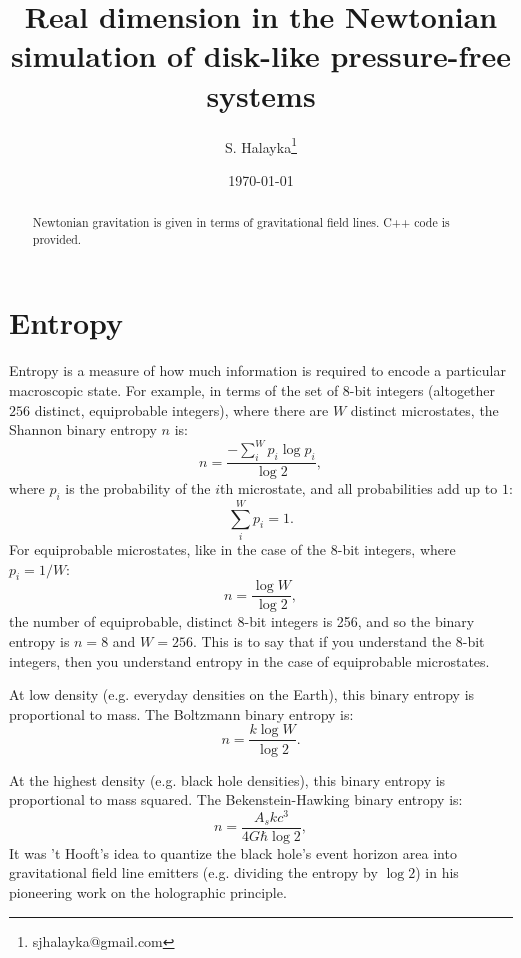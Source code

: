 \documentclass[12pt]{article}
\title{Real dimension in the Newtonian simulation of disk-like pressure-free systems}
\author{S. Halayka\footnote{sjhalayka@gmail.com}}
\date{\today\;\currenttime}
\begin{document}
 
\maketitle

\begin{abstract}
Newtonian gravitation is given in terms of gravitational field lines.
C++ code is provided.
\end{abstract}




\section{Entropy}
Entropy is a measure of how much information is required to encode a particular macroscopic state.
For example, in terms of the set of 8-bit integers (altogether $256$ distinct, equiprobable integers), where there are $W$ distinct microstates, the Shannon binary entropy $n$ is:
\begin{equation}
n =  \frac{-\sum_{i}^{W} p_i \log p_i} {\log 2},
\end{equation}
where $p_i$ is the probability of the $i$th microstate, and all probabilities add up to $1$:
\begin{equation}
\sum_{i}^{W} p_i = 1.
\end{equation}
For equiprobable microstates, like in the case of the 8-bit integers, where $p_i = 1/W$:
\begin{equation}
n = \frac{\log W}{\log 2},
\end{equation}
the number of equiprobable, distinct 8-bit integers is 256, and so the binary entropy is $n = 8$ and $W= 256$.
This is to say that if you understand the 8-bit integers, then you understand entropy in the case of equiprobable microstates.

At low density (e.g. everyday densities on the Earth), this binary entropy is proportional to mass.
The Boltzmann binary entropy is:
\begin{equation}
n = \frac{k \log W}{\log 2}.
\end{equation}

At the highest density (e.g. black hole densities), this binary entropy is proportional to mass squared.
The Bekenstein-Hawking binary entropy is:
\begin{equation}
n = \frac{A_s k c^3}{ 4 G \hbar \log 2},
\end{equation}
It was 't Hooft's idea to quantize the black hole's event horizon area into gravitational field line emitters (e.g. dividing the entropy by $\log 2$) in his pioneering work on the holographic principle.
\end{document}
